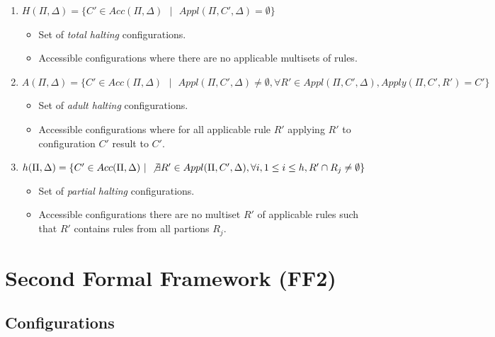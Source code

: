\documentclass{article}
\newcommand{\s}{\text{ }}
\begin{document}
\begin{appendices}
\begin{enumerate}
   \item $H(\Pi, \Delta) = \{C' \in Acc(\Pi, \Delta) \s | \s Appl(\Pi, C', \Delta) = \emptyset\}$
         \begin{itemize}
         \item Set of \textit{total halting} configurations.
         \item Accessible configurations where there are no applicable multisets of rules.
         \end{itemize}
   \item $A(\Pi, \Delta) = \{C' \in Acc(\Pi, \Delta) \s | \s Appl(\Pi, C', \Delta) \neq \emptyset, \forall R' \in Appl(\Pi,C',\Delta), Apply(\Pi,C',R')=C' \}$
         \begin{itemize}
         \item Set of \textit{adult halting} configurations. 
         \item Accessible configurations where for all applicable rule $R'$ applying $R'$ to configuration $C'$ result to $C'$.
         \end{itemize}
   \item $h(\Pi, \Delta) = \{C' \in Acc(\Pi, \Delta) \s | \s \not\exists R' \in Appl(\Pi, C', \Delta), \forall i, 1 \leq i \leq h, R' \cap R_j \neq \emptyset \}$
         \begin{itemize}
         \item Set of \textit{partial halting} configurations. 
         \item Accessible configurations there are no multiset $R'$ of applicable rules such that $R'$ contains rules from all partions $R_j$.
         \end{itemize}
\end{enumerate}


\section{Second Formal Framework (FF2)}\label{a-ff2}


\subsection{Configurations} \label{a-ff2-config}


\end{appendices}
\end{document}
